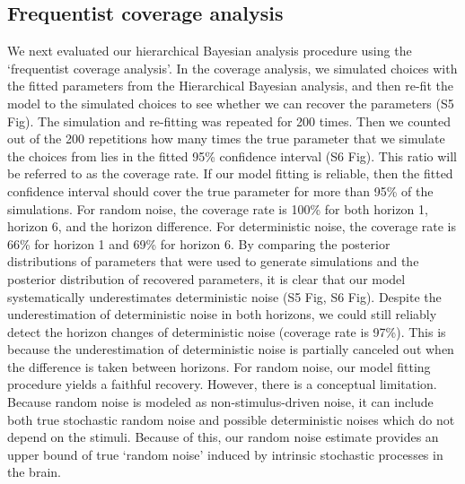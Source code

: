 \documentclass[12pt]{article}
\begin{document}
	\subsection{Frequentist coverage analysis}	
	We next evaluated our hierarchical Bayesian analysis procedure using the `frequentist coverage analysis'. In the coverage analysis, we simulated choices with the fitted parameters from the Hierarchical Bayesian analysis, and then re-fit the model to the simulated choices to see whether we can recover the parameters (S5 Fig). The simulation and re-fitting was repeated for 200 times. Then we counted out of the 200 repetitions how many times the true parameter that we simulate the choices from lies in the fitted 95\% confidence interval (S6 Fig). This ratio will be referred to as the coverage rate. If our model fitting is reliable, then the fitted confidence interval should cover the true parameter for more than 95\% of the simulations. For random noise, the coverage rate is 100\% for both horizon 1, horizon 6, and the horizon difference. For deterministic noise, the coverage rate is 66\% for horizon 1 and 69\% for horizon 6. By comparing the posterior distributions of parameters that were used to generate simulations and the posterior distribution of recovered parameters, it is clear that our model systematically underestimates deterministic noise (S5 Fig, S6 Fig). Despite the underestimation of deterministic noise in both horizons, we could still reliably detect the horizon changes of deterministic noise (coverage rate is 97\%). This is because the underestimation of deterministic noise is partially canceled out when the difference is taken between horizons. For random noise, our model fitting procedure yields a faithful recovery. However, there is a conceptual limitation. Because random noise is modeled as non-stimulus-driven noise, it can include both true stochastic random noise and possible deterministic noises which do not depend on the stimuli. Because of this, our random noise estimate provides an upper bound of true `random noise' induced by intrinsic stochastic processes in the brain.
	
\end{document}
